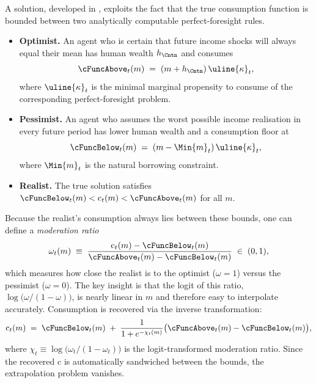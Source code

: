 \documentclass[titlepage, headings=optiontotocandhead]{econark}
\begin{document}
A solution, developed in \cite{method-of-moderation}, exploits the fact that the
true consumption function is bounded between two analytically
computable perfect-foresight rules.
\begin{itemize}
  \item \textbf{Optimist.} An agent who is certain that future income
  shocks will always equal their mean has human wealth
  $h_{\Cntn}$ and consumes
  \begin{equation}
    \cFuncAbove_{t}(m) \;=\;
      (m + h_{\Cntn})\,{\uline{\kappa}}_{t},
      \label{eq:cFuncAboveBrief}
  \end{equation}
  where ${\uline{\kappa}}_{t}$ is the minimal marginal propensity to
  consume of the corresponding perfect-foresight problem.
  \item \textbf{Pessimist.} An agent who assumes the worst possible
  income realisation in every future period has lower human wealth and
  a consumption floor at
  \begin{equation}
    \cFuncBelow_{t}(m) \;=\;
      (m - \Min{m}_{t})\,{\uline{\kappa}}_{t},
      \label{eq:cFuncBelowBrief}
  \end{equation}
  where $\Min{m}_{t}$ is the natural borrowing constraint.
  \item \textbf{Realist.}  The true solution satisfies
  $\cFuncBelow_{t}(m) < \mathrm{c}_{t}(m) <
  \cFuncAbove_{t}(m)$ for all $m$.
\end{itemize}

Because the realist's consumption always lies between these bounds, one can
define a \textit{moderation ratio}
\begin{equation}
  \omega_{t}(m) \;\equiv\;
    \frac{\mathrm{c}_{t}(m) - \cFuncBelow_{t}(m)}
         {\cFuncAbove_{t}(m) - \cFuncBelow_{t}(m)}
    \;\in\; (0,1),
  \label{eq:modRteBrief}
\end{equation}
which measures how close the realist is to the optimist
($\omega=1$) versus the pessimist ($\omega=0$).  The key insight is
that the logit of this ratio,
$\log\!\bigl(\omega/(1-\omega)\bigr)$, is nearly linear
in $m$ and therefore easy to interpolate accurately.  Consumption
is recovered via the inverse transformation:
\begin{equation}
  \mathrm{c}_{t}(m) \;=\;
    \cFuncBelow_{t}(m) \;+\;
    \frac{1}{1+e^{-\chi_{t}(m)}}
    \bigl(\cFuncAbove_{t}(m) - \cFuncBelow_{t}(m)\bigr),
  \label{eq:cFromChiBrief}
\end{equation}
where $\chi_{t} \equiv \log\!\bigl(\omega_{t}/(1-\omega_{t})\bigr)$
is the logit-transformed moderation ratio.  Since the recovered $\mathrm{c}$
is automatically sandwiched between the bounds, the extrapolation problem
vanishes.
\end{document}
